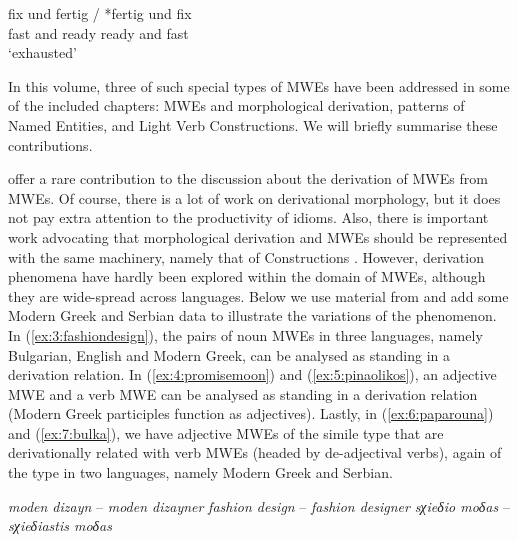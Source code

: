 \documentclass[output=paper]{langsci/langscibook}
\begin{document}
\ea
\label{muellerg-binom}
\settowidth {}
\gll fix und fertig / *fertig und fix\\ 
fast and ready {} ready and fast\\ 
\glt ‘exhausted’
\z

In this volume, three of such special types of MWEs have been addressed in some of the included chapters: 
MWEs and morphological  derivation, patterns of Named Entities, and Light Verb Constructions. 
We will briefly summarise these contributions.

offer a rare contribution to the discussion about the derivation  of MWEs from MWEs.  
Of course, there is a lot of work on derivational morphology, but it does not pay extra attention to the productivity of idioms. 
Also, there is important work advocating that morphological derivation and MWEs should be represented with the same machinery, namely that of Constructions \citep{Riehemann:01}. 
However, derivation phenomena  have hardly been explored within the domain of MWEs, although they are wide-spread across languages. 
Below we use material from 
and add some Modern Greek and Serbian data to illustrate the variations of the phenomenon. 
In (\ref{ex:3:fashiondesign}), the pairs of noun MWEs in three languages, namely Bulgarian, English and Modern Greek, can be analysed as standing in a derivation relation. In (\ref{ex:4:promisemoon}) and (\ref{ex:5:pinaolikos}), an adjective MWE and a verb MWE can be analysed as standing in a derivation relation (Modern Greek participles function as adjectives). 
Lastly, in (\ref{ex:6:paparouna}) and (\ref{ex:7:bulka}), we have adjective MWEs of the simile type that are derivationally related with verb MWEs (headed by de-adjectival verbs), again of the  type in two languages, namely Modern Greek and Serbian.


\begin{exe}

\ex \label{ex:3:fashiondesign}
\settowidth {}
\begin{xlist}
\ex \textit{moden dizayn} -- \textit{moden dizayner}   
\ex \textit{fashion design} -- \textit{fashion designer}   
\ex \textit{sχieδio moδas} -- \textit{sχieδiastis moδas}  
\end{xlist}
\end{exe}
\end{document}
